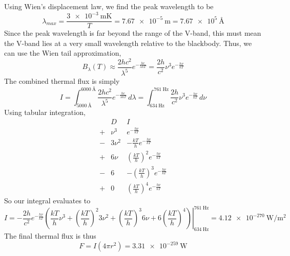 \documentclass{article}
\begin{document}
Using Wien's displacement law, we find the peak wavelength to be
\begin{equation}
    \lambda_{max} = \frac{\SI{3e-3}{\meter\kelvin}}{T} = \SI{7.67e-5}{\meter} = \SI{7.67e+5}{\angstrom}
\end{equation}
Since the peak wavelength is far beyond the range of the V-band, this must mean the V-band lies at a very small wavelength relative to the blackbody.
Thus, we can use the Wien tail approximation,
\begin{equation}
    B_\lambda(T) \approx \frac{2hc^2}{\lambda^5} e^{-\frac{hc}{\lambda k T}} = \frac{2h}{c^2} \nu^3 e^{-\frac{h \nu}{k T}}
\end{equation}
The combined thermal flux is simply
\begin{equation}
    I = \int_{\SI{5000}{\angstrom}}^{\SI{6000}{\angstrom}} \frac{2hc^2}{\lambda^5} e^{-\frac{hc}{\lambda k T}} \, d\lambda = \int_{\SI{634}{\hertz}}^{\SI{761}{\hertz}} \frac{2h}{c^2} \nu^3 e^{-\frac{h \nu}{k T}} \, d\nu
\end{equation}
Using tabular integration,
\begin{equation}
    \begin{array}{c|c|c}
        & D & I \\
        \hline
        + & \nu^3 & e^{-\frac{h \nu}{k T}} \\
        - & 3\nu^2 & -\frac{k T}{h} e^{-\frac{h \nu}{k T}} \\
        + & 6\nu & \left(\frac{k T}{h}\right)^2 e^{-\frac{h \nu}{k T}} \\
        - & 6 & -\left(\frac{k T}{h}\right)^3 e^{-\frac{h \nu}{k T}} \\
        + & 0 & \left(\frac{k T}{h}\right)^4 e^{-\frac{h \nu}{k T}}
    \end{array}
\end{equation}
So our integral evaluates to
\begin{equation}
    I = \left.-\frac{2h}{c^2} e^{-\frac{h \nu}{k T}} \left(\frac{k T}{h} \nu^3 + \left(\frac{k T}{h}\right)^2 3\nu^2 + \left(\frac{k T}{h}\right)^3 6\nu + 6\left(\frac{k T}{h}\right)^4\right)\right|_{\SI{634}{\hertz}}^{\SI{761}{\hertz}} = \SI{4.12e-270}{\watt\per\meter\squared}
\end{equation}
The final thermal flux is thus
\begin{equation}
    F = I (4 \pi r^2) = \SI{3.31e-259}{\watt}
\end{equation}

\subsection{}
\end{document}
